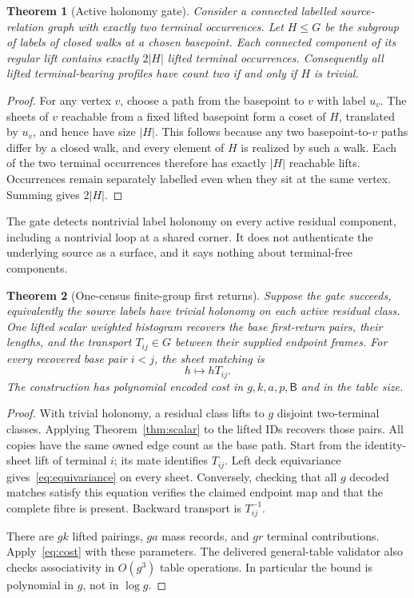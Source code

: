 \documentclass[11pt]{article}
\newtheorem{theorem}{Theorem}[section]
\theoremstyle{definition}\newtheorem{definition}[theorem]{Definition}\newtheorem{example}[theorem]{Example}
\theoremstyle{remark}\newtheorem{remark}[theorem]{Remark}
\newcommand{\bits}{\mathsf B}
\begin{document}
\begin{theorem}[Active holonomy gate]
\label{thm:gate}
Consider a connected labelled source-relation graph with exactly two terminal occurrences. Let $H\le G$ be the subgroup of labels of closed walks at a chosen basepoint. Each connected component of its regular lift contains exactly $2|H|$ lifted terminal occurrences. Consequently all lifted terminal-bearing profiles have count two if and only if $H$ is trivial.
\end{theorem}
\begin{proof}
For any vertex $v$, choose a path from the basepoint to $v$ with label $u_v$. The sheets of $v$ reachable from a fixed lifted basepoint form a coset of $H$, translated by $u_v$, and hence have size $|H|$. This follows because any two basepoint-to-$v$ paths differ by a closed walk, and every element of $H$ is realized by such a walk. Each of the two terminal occurrences therefore has exactly $|H|$ reachable lifts. Occurrences remain separately labelled even when they sit at the same vertex. Summing gives $2|H|$.
\end{proof}

The gate detects nontrivial label holonomy on every active residual component, including a nontrivial loop at a shared corner. It does not authenticate the underlying source as a surface, and it says nothing about terminal-free components.

\begin{theorem}[One-census finite-group first returns]
\label{thm:transport}
Suppose the gate succeeds, equivalently the source labels have trivial holonomy on each active residual class. One lifted scalar weighted histogram recovers the base first-return pairs, their lengths, and the transport $T_{ij}\in G$ between their supplied endpoint frames. For every recovered base pair $i<j$, the sheet matching is
\begin{equation}\label{eq:equivariance}
                                h\longmapsto hT_{ij}.
\end{equation}
The construction has polynomial encoded cost in $g,k,a,p,\bits$ and in the table size.
\end{theorem}
\begin{proof}
With trivial holonomy, a residual class lifts to $g$ disjoint two-terminal classes. Applying Theorem~\ref{thm:scalar} to the lifted IDs recovers those pairs. All copies have the same owned edge count as the base path. Start from the identity-sheet lift of terminal $i$; its mate identifies $T_{ij}$. Left deck equivariance gives~\eqref{eq:equivariance} on every sheet. Conversely, checking that all $g$ decoded matches satisfy this equation verifies the claimed endpoint map and that the complete fibre is present. Backward transport is $T_{ij}^{-1}$.

There are $gk$ lifted pairings, $ga$ mass records, and $gr$ terminal contributions. Apply~\eqref{eq:cost} with these parameters. The delivered general-table validator also checks associativity in $O(g^3)$ table operations. In particular the bound is polynomial in $g$, not in $\log g$.
\end{proof}
\end{document}
